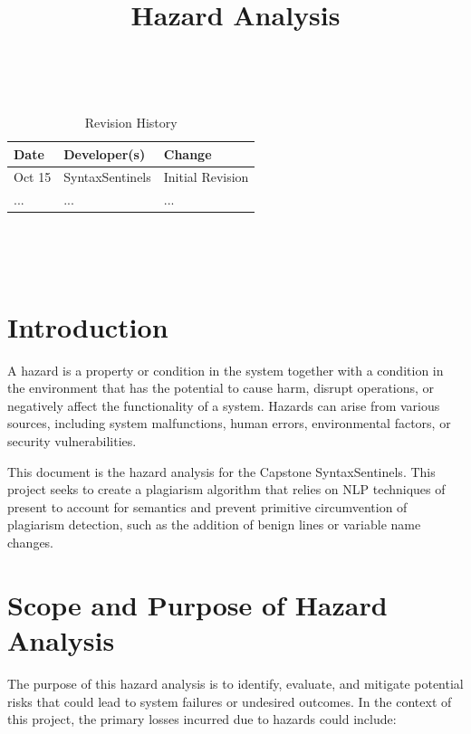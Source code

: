 \documentclass{article}
\title{Hazard Analysis\\\progname}
\author{\authname}
\date{}
\begin{document}
\maketitle
\thispagestyle{empty}

~\newpage


\begin{table}[hp]
\caption*{Revision History} \label{TblRevisionHistory}
\begin{tabularx}{\textwidth}{llX}
\toprule
\textbf{Date} & \textbf{Developer(s)} & \textbf{Change}\\
\midrule
Oct 15 & SyntaxSentinels & Initial Revision\\
... & ... & ...\\
\bottomrule
\end{tabularx}
\end{table}

~\newpage

\tableofcontents

\listoftables

~\newpage



\section{Introduction}

A hazard is a property or condition in the system together with a condition in the environment that has the potential to cause harm, disrupt operations, 
or negatively affect the functionality of a system. Hazards can arise from various sources, including system 
malfunctions, human errors, environmental factors, or security vulnerabilities.

This document is the hazard analysis for the Capstone SyntaxSentinels. This project seeks to create a plagiarism algorithm that relies on NLP
techniques of present to account for semantics and prevent primitive circumvention of plagiarism detection, such as the addition of benign lines or
variable name changes.

\section{Scope and Purpose of Hazard Analysis}

The purpose of this hazard analysis is to identify, evaluate, and mitigate potential risks that could lead to system failures or undesired outcomes. In the context of this project, the primary losses incurred due to hazards could include:
\end{document}
